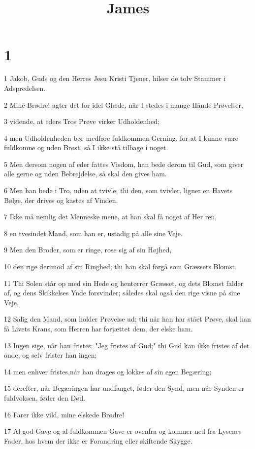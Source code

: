 

\title{James}


\chapter{1}

\par 1 Jakob, Guds og den Herres Jesu Kristi Tjener, hilser de tolv Stammer i Adspredelsen.
\par 2 Mine Brødre! agter det for idel Glæde, når I stedes i mange Hånde Prøvelser,
\par 3 vidende, at eders Tros Prøve virker Udholdenhed;
\par 4 men Udholdenheden bør medføre fuldkommen Gerning, for at I kunne være fuldkomne og uden Brøst, så I ikke stå tilbage i noget.
\par 5 Men dersom nogen af eder fattes Visdom, han bede derom til Gud, som giver alle gerne og uden Bebrejdelse, så skal den gives ham.
\par 6 Men han bede i Tro, uden at tvivle; thi den, som tvivler, ligner en Havets Bølge, der drives og kastes af Vinden.
\par 7 Ikke må nemlig det Menneske mene, at han skal få noget af Her ren,
\par 8 en tvesindet Mand, som han er, ustadig på alle sine Veje.
\par 9 Men den Broder, som er ringe, rose sig af sin Højhed,
\par 10 den rige derimod af sin Ringhed; thi han skal forgå som Græssets Blomst.
\par 11 Thi Solen står op med sin Hede og hentørrer Græsset, og dets Blomst falder af, og dens Skikkelses Ynde forsvinder; således skal også den rige visne på sine Veje.
\par 12 Salig den Mand, som holder Prøvelse ud; thi når han har stået Prøve, skal han få Livets Krans, som Herren har forjættet dem, der elske ham.
\par 13 Ingen sige, når han fristes: "Jeg fristes af Gud;" thi Gud kan ikke fristes af det onde, og selv frister han ingen;
\par 14 men enhver fristes,når han drages og lokkes af sin egen Begæring;
\par 15 derefter, når Begæringen har undfanget, føder den Synd, men når Synden er fuldvoksen, føder den Død.
\par 16 Farer ikke vild, mine elskede Brødre!
\par 17 Al god Gave og al fuldkommen Gave er ovenfra og kommer ned fra Lysenes Fader, hos hvem der ikke er Forandring eller skiftende Skygge.
